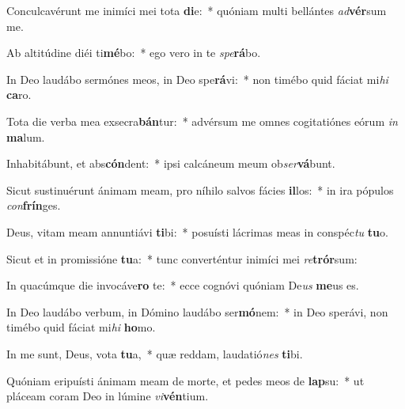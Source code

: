 \item Conculcavérunt me inimíci mei tota \textbf{di}e:~* quóniam multi bellántes \textit{ad}\textbf{vér}sum me.
\item Ab altitúdine diéi ti\textbf{mé}bo:~* ego vero in te \textit{spe}\textbf{rá}bo.
\item In Deo laudábo sermónes meos, in Deo spe\textbf{rá}vi:~* non timébo quid fáciat mi\textit{hi} \textbf{ca}ro.
\item Tota die verba mea exsecra\textbf{bán}tur:~* advérsum me omnes cogitatiónes eórum \textit{in} \textbf{ma}lum.
\item Inhabitábunt, et abs\textbf{cón}dent:~* ipsi calcáneum meum ob\textit{ser}\textbf{vá}bunt.
\item Sicut sustinuérunt ánimam meam, pro níhilo salvos fácies \textbf{il}los:~* in ira pópulos \textit{con}\textbf{frín}ges.
\item Deus, vitam meam annuntiávi \textbf{ti}bi:~* posuísti lácrimas meas in conspéc\textit{tu} \textbf{tu}o.
\item Sicut et in promissióne \textbf{tu}a:~* tunc converténtur inimíci mei \textit{re}\textbf{trór}sum:
\item In quacúmque die invocáve\textbf{ro} te:~* ecce cognóvi quóniam De\textit{us} \textbf{me}us es.
\item In Deo laudábo verbum, in Dómino laudábo ser\textbf{mó}nem:~* in Deo sperávi, non timébo quid fáciat mi\textit{hi} \textbf{ho}mo.
\item In me sunt, Deus, vota \textbf{tu}a,~* quæ reddam, laudatió\textit{nes} \textbf{ti}bi.
\item Quóniam eripuísti ánimam meam de morte, et pedes meos de \textbf{lap}su:~* ut pláceam coram Deo in lúmine \textit{vi}\textbf{vén}tium.
